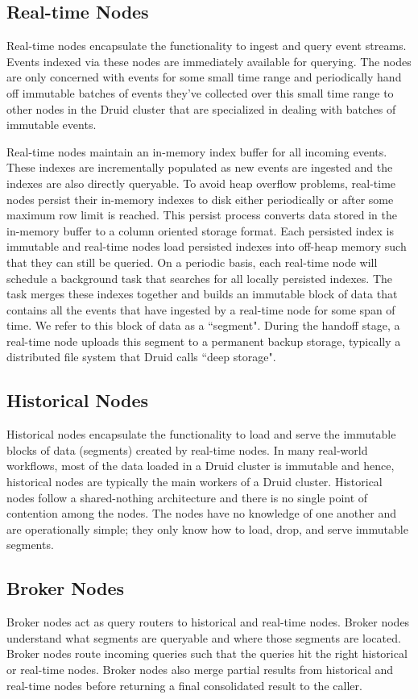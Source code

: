 \documentclass{vldb}
\begin{document}
\subsection{Real-time Nodes}
Real-time nodes encapsulate the functionality to ingest and query event
streams. Events indexed via these nodes are immediately available for querying.
The nodes are only concerned with events for some small time range and
periodically hand off immutable batches of events they've collected over this
small time range to other nodes in the Druid cluster that are specialized in
dealing with batches of immutable events. 

Real-time nodes maintain an in-memory index buffer for all incoming events.
These indexes are incrementally populated as new events are ingested and the
indexes are also directly queryable. To avoid heap overflow problems, real-time
nodes persist their in-memory indexes to disk either periodically or after some
maximum row limit is reached. This persist process converts data stored in the
in-memory buffer to a column oriented storage format. Each persisted index is
immutable and real-time nodes load persisted indexes into off-heap memory such
that they can still be queried. On a periodic basis, each real-time node will
schedule a background task that searches for all locally persisted indexes. The
task merges these indexes together and builds an immutable block of data that
contains all the events that have ingested by a real-time node for some span of
time. We refer to this block of data as a ``segment". During the handoff stage,
a real-time node uploads this segment to a permanent backup storage, typically
a distributed file system that Druid calls ``deep storage".

\subsection{Historical Nodes}
Historical nodes encapsulate the functionality to load and serve the immutable
blocks of data (segments) created by real-time nodes. In many real-world
workflows, most of the data loaded in a Druid cluster is immutable and hence,
historical nodes are typically the main workers of a Druid cluster.  Historical
nodes follow a shared-nothing architecture and there is no single point of
contention among the nodes. The nodes have no knowledge of one another and are
operationally simple; they only know how to load, drop, and serve immutable
segments.

\subsection{Broker Nodes}
Broker nodes act as query routers to historical and real-time nodes. Broker
nodes understand what segments are queryable and where those segments are
located. Broker nodes route incoming queries such that the queries hit the
right historical or real-time nodes. Broker nodes also merge partial results
from historical and real-time nodes before returning a final consolidated
result to the caller.
\end{document}

